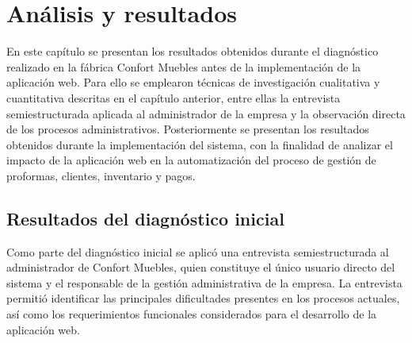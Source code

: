 \chapter{Análisis y resultados}

En este capítulo se presentan los resultados obtenidos durante el diagnóstico realizado en la fábrica Confort Muebles antes de la implementación de la aplicación web. Para ello se emplearon técnicas de investigación cualitativa y cuantitativa descritas en el capítulo anterior, entre ellas la entrevista semiestructurada aplicada al administrador de la empresa y la observación directa de los procesos administrativos.
Posteriormente se presentan los resultados obtenidos durante la implementación del sistema, con la finalidad de analizar el impacto de la aplicación web en la automatización del proceso de gestión de proformas, clientes, inventario y pagos.
\section{Resultados del diagnóstico inicial}
Como parte del diagnóstico inicial se aplicó una entrevista semiestructurada al administrador de Confort Muebles, quien constituye el único usuario directo del sistema y el responsable de la gestión administrativa de la empresa. La entrevista permitió identificar las principales dificultades presentes en los procesos actuales, así como los requerimientos funcionales considerados para el desarrollo de la aplicación web.
